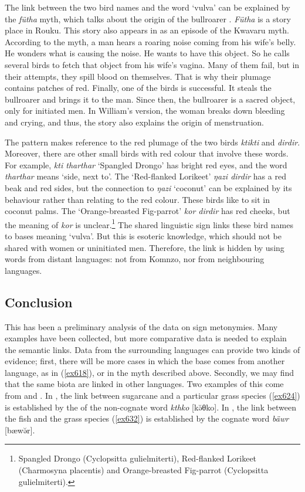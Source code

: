 The link between the two bird names and the word `vulva' can be explained by the \emph{fütha} myth, which talks about the origin of the bullroarer \citep[80]{Ayres:ws}. \emph{Fütha} is a story place in Rouku. This story also appears in \citep[307]{Williams:1936transfly} as an episode of the Kwavaru myth. According to the myth, a man hears a roaring noise coming from his wife's belly. He wonders what is causing the noise. He wants to have this object. So he calls several birds  to fetch that object from his wife's vagina. Many of them fail, but in their attempts, they spill blood on themselves. That is why their plumage contains patches of red. Finally, one of the birds is successful. It steals the bullroarer and brings it to the man. Since then, the bullroarer is a sacred object, only for initiated men. In William's version, the woman breaks down bleeding and crying, and thus, the story also explains the origin of menstruation.

The  pattern makes reference to the red plumage of the two birds \emph{ktikti} and \emph{dirdir}. Moreover, there are other small birds with red colour that involve these words. For example, \emph{kti tharthar} `Spangled Drongo' has bright red eyes, and the word \emph{tharthar} means `side, next to'. The `Red-flanked Lorikeet' \emph{ŋazi dirdir} has a red beak and red sides, but the connection to \emph{ŋazi} `coconut' can be explained by its behaviour rather than relating to the red colour. These birds like to sit in coconut palms. The `Orange-breasted Fig-parrot' \emph{kor dirdir} has red cheeks, but the meaning of \emph{kor} is unclear.\footnote{Spangled Drongo (Cyclopsitta gulielmiterti), Red-flanked Lorikeet (Charmosyna placentis) and Orange-breasted Fig-parrot (Cyclopsitta gulielmiterti).} The shared linguistic sign links these bird names to bases meaning `vulva'. But this is esoteric knowledge, which should not be shared with women or uninitiated men. Therefore, the link is hidden by using words from distant languages: not from Komnzo, nor from neighbouring languages.

\subsection{Conclusion}\label{redupconcl}

This has been a preliminary analysis of the data on sign metonymies. Many examples have been collected, but more comparative data is needed to explain the semantic links. Data from the surrounding languages can provide two kinds of evidence; first, there will be more cases in which the base comes from another language, as in (\ref{ex618}), or in the myth described above. Secondly, we may find that the same biota are linked in other languages. Two examples of this come from  and . In , the link between sugarcane and a particular grass species (\ref{ex624}) is established by the  of the non-cognate word \emph{kthko} [kə̆θko]. In , the  link between the fish and the grass species (\ref{ex632}) is established by the cognate word \emph{bäwr} [bæwə̆r].

